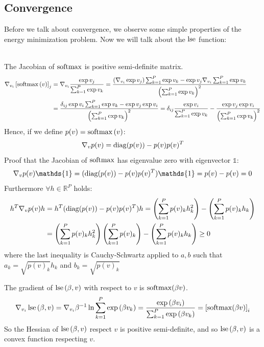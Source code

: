 \subsection{Convergence}
Before we talk about convergence, we observe some simple properties of the energy minimization problem. Now we will talk about the $\operatorname{lse}$ function:
\begin{remark}
\\
    The Jacobian of $\operatorname{softmax}$ is positive semi-definite matrix.
    \begin{align*}
        \nabla_{v_i}\left[\operatorname{softmax}\left(v\right)\right]_j &= \nabla_{v_i}\frac{\exp v_j}{\sum_{k=1}^{P}\exp v_k} = \frac{\left(\nabla_{v_i}\exp v_j\right)\sum_{k=1}^{P}\exp v_k-\exp v_j\nabla_{v_i}\sum_{k=1}^{P}\exp v_k}{\left(\sum_{k=1}^{P}\exp v_k\right)^2} \\
        &= \frac{\delta_{ij}\exp v_i\sum_{k=1}^{P}\exp v_k-\exp v_j\exp v_i}{\left(\sum_{k=1}^{P}\exp v_k\right)^2} = \delta_{ij}\frac{\exp v_i}{\sum_{k=1}^{P}\exp v_k}-\frac{\exp v_j\exp v_i}{\left(\sum_{k=1}^{P}\exp v_k\right)^2}
    \end{align*}
    Hence, if we define $p(v)=\operatorname{softmax}\left(v\right)$:
    \[
        \nabla_{v}p(v) = \operatorname{diag}(p(v))-p(v)p(v)^T
    \]
    Proof that the Jacobian of $\operatorname{softmax}$ has eigenvalue zero with eigenvector $\mathds{1}$:
    \[
        \nabla_{v}p(v)\mathds{1} = (\diagonal(p(v))-p(v)p(v)^T)\mathds{1} = p(v) - p(v) = 0
    \]
    Furthermore $\forall h \in \mathbb{R}^P $ holds:
     \begin{align*}
         h^T \nabla_{v}p(v) h &= h^T ( \operatorname{diag}(p(v))-p(v)p(v)^T ) h = \left(\sum_{k=1}^{P} p(v)_k h_k^2\right)- \left( \sum_{k=1}^P p(v)_k h_k \right)\\
         &= \left(\sum_{k=1}^{P} p(v)_k h_k^2\right)\left(\sum_{k=1}^P p(v)_k \right)- \left( \sum_{k=1}^P p(v)_k h_k \right) \geq 0
     \end{align*}
     where the last inequality is Cauchy-Schwartz applied to $a ,b$ such that $a_k=\sqrt{p(v)_k}h_k$ and $b_k = \sqrt{p(v)_k}$
\end{remark}
\begin{remark}
    The gradient of $\operatorname{lse}\left(\beta, v\right)$ with respect to $v$ is $\operatorname{softmax}(\beta v)$.
    \[
    \nabla_{v_i}\operatorname{lse}\left(\beta, v\right) = \nabla_{v_i}\beta^{-1}\ln\sum_{k=1}^{P}\exp\left(\beta v_k\right) = \frac{\exp\left(\beta v_i\right)}{\sum_{k=1}^{P}\exp\left(\beta v_k\right)} = \left[\operatorname{softmax}(\beta v)\right]_i
    \]
    So the Hessian of $\operatorname{lse}\left(\beta, v\right)$ respect $v$ is positive semi-definite, and so $\operatorname{lse}\left(\beta, v\right)$ is a convex function respecting $v$.
\end{remark}

